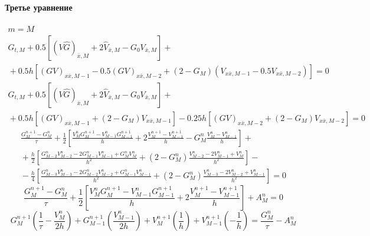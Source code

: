 \paragraph{Третье уравнение}
\begin{multline*}
m = M 
\\
  G_{t,M} + 0.5 [(V \hat G)_{\bar x,M} + 2 \hat V_{\bar x,M} - G_0 V_{\bar x,M}]
  +{} \\ {}+
  0.5h [
    (GV)_{x \bar x, M-1} - 0.5(GV)_{x \bar x, M-2} +
    (2 - G_M) (V_{x \bar x, M-1} - 0.5V_{x \bar x, M-2}) ] = 0
\\
  G_{t,M} + 0.5 [(V \hat G)_{\bar x,M} + 2 \hat V_{\bar x,M} - G_0 V_{\bar x,M}]
  +{} \\ {}+
  0.5h  [(GV)_{x \bar x, M-1} + (2 - G_M) V_{x \bar x, M-1}] -
  0.25h [(GV)_{x \bar x, M-2} + (2 - G_M) V_{x \bar x, M-2}]  = 0
\end{multline*}
\begin{multline*}
  \frac{G_{M}^{n+1} - G_{M}^{n}}{\tau} 
  + \frac12 \left[
    \frac{V_{M}^{n} G_{M}^{n+1} - V_{M-1}^{n} G_{M-1}^{n+1}}{h} 
    + 2 \frac{V_{M}^{n+1} - V_{M-1}^{n+1}}{h} 
    - G_{M}^{n} \frac{V_{M}^{n} - V_{M-1}^{n}}{h} 
    \right] +{} \\ {}+
 \frac{h}{2} \left[
    \frac{G_{M-2}^{n} V_{M-2}^{n} - 2 G_{M-1}^{n} V_{M-1}^{n} + G_{M}^{n} V_{M}^{n}}{h^2} + 
    (2 - G_{M}^{n}) \frac{V_{M-2}^{n} - 2 V_{M-1}^{n} + V_{M}^{n}}{h^2}
    \right] -{} \\ {}-
 \frac{h}{4} \left[
    \frac{G_{M-3}^{n} V_{M-3}^{n} - 2 G_{M-2}^{n} V_{M-2}^{n} + G_{M-1}^{n} V_{M-1}^{n}}{h^2} + 
    (2 - G_{M}^{n}) \frac{V_{M-3}^{n} - 2 V_{M-2}^{n} + V_{M-1}^{n}}{h^2}
    \right] = 0
\end{multline*}
\begin{equation*}
  \frac{G_{M}^{n+1} - G_{M}^{n}}{\tau} 
  + \frac12 \left[
    \frac{V_{M}^{n} G_{M}^{n+1} - V_{M-1}^{n} G_{M-1}^{n+1}}{h} 
    + 2 \frac{V_{M}^{n+1} - V_{M-1}^{n+1}}{h} \right] + A_{M}^{n} = 0
\end{equation*}
\begin{equation*}
  G_{M}^{n+1} \left( \frac{1}{\tau} - \frac{V_{M}^{n}}{2h} \right) +
  G_{M-1}^{n+1} \left( \frac{V_{M-1}^{n}}{2h} \right) +
  V_{M}^{n+1} \left( \frac{1}{h} \right) +
  V_{M-1}^{n+1} \left(-\frac{1}{h} \right) = \frac{G_{M}^{n}}{\tau} - A_{M}^{n}
\end{equation*}


